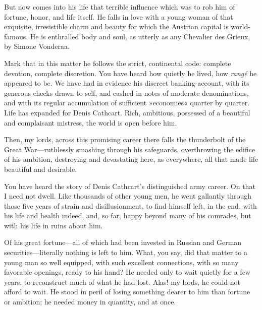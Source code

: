 \begin{dialogue}
\smallskip 

But now comes into his life that terrible influence which was to rob him of fortune, honor, and life itself. He falls in love with a young woman of that exquisite, irresistible charm and beauty for which the Austrian capital is world-famous. He is enthralled body and soul, as utterly as any Chevalier des Grieux, by Simone Vonderaa.

\smallskip 

Mark that in this matter he follows the strict, continental code: complete devotion, complete discretion. You have heard how quietly he lived, how \textit{rangé} he appeared to be. We have had in evidence his discreet banking-account, with its generous checks drawn to self, and cashed in notes of moderate denominations, and with its regular accumulation of sufficient »economies« quarter by quarter. Life has expanded for Denis Cathcart. Rich, ambitious, possessed of a beautiful and complaisant mistress, the world is open before him.

\smallskip 

Then, my lords, across this promising career there falls the thunderbolt of the Great War\allowbreak---\allowbreak ruthlessly smashing through his safeguards, overthrowing the edifice of his ambition, destroying and devastating here, as everywhere, all that made life beautiful and desirable.

\smallskip 

You have heard the story of Denis Cathcart's distinguished army career. On that I need not dwell. Like thousands of other young men, he went gallantly through those five years of strain and disillusionment, to find himself left, in the end, with his life and health indeed, and, so far, happy beyond many of his comrades, but with his life in ruins about him.

\smallskip 

Of his great fortune\allowbreak---\allowbreak all of which had been invested in Russian and German securities\allowbreak---\allowbreak literally nothing is left to him. What, you say, did that matter to a young man so well equipped, with such excellent connections, with so many favorable openings, ready to his hand? He needed only to wait quietly for a few years, to reconstruct much of what he had lost. Alas! my lords, he could not afford to wait. He stood in peril of losing something dearer to him than fortune or ambition; he needed money in quantity, and at once.

\smallskip 


\end{dialogue}
